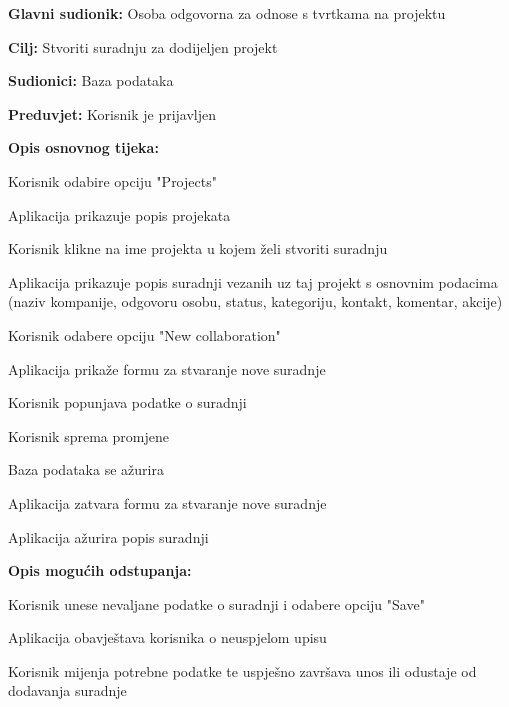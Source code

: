 					\noindent {}
					\begin{packed_item}

						\item \textbf{Glavni sudionik:} Osoba odgovorna za odnose s tvrtkama na projektu
						\item \textbf{Cilj:} Stvoriti suradnju za dodijeljen projekt
						\item \textbf{Sudionici:} Baza podataka
						\item \textbf{Preduvjet:} Korisnik je prijavljen
						\item \textbf{Opis osnovnog tijeka:}

						\item[] \begin{packed_enum}

							\item Korisnik odabire opciju "Projects"
							\item Aplikacija prikazuje popis projekata
							\item Korisnik klikne na ime projekta u kojem želi stvoriti suradnju
							\item Aplikacija prikazuje popis suradnji vezanih uz taj projekt s osnovnim podacima (naziv kompanije, odgovoru osobu, status, kategoriju, kontakt, komentar, akcije)
							\item Korisnik odabere opciju "New collaboration"
							\item Aplikacija prikaže formu za stvaranje nove suradnje
							\item Korisnik popunjava podatke o suradnji
							\item Korisnik sprema promjene
							\item Baza podataka se ažurira
							\item Aplikacija zatvara formu za stvaranje nove suradnje
							\item Aplikacija ažurira popis suradnji
						\end{packed_enum}

						\item \textbf{Opis mogućih odstupanja:}

						\item[] \begin{packed_item}

							\item[8.c] Korisnik unese nevaljane podatke o suradnji i odabere opciju "Save"
							\item[] \begin{packed_enum}

								\item Aplikacija obavještava korisnika o neuspjelom upisu
								\item Korisnik mijenja potrebne podatke te uspješno završava unos ili
								odustaje od dodavanja suradnje

							\end{packed_enum}

						\end{packed_item}
					\end{packed_item}

